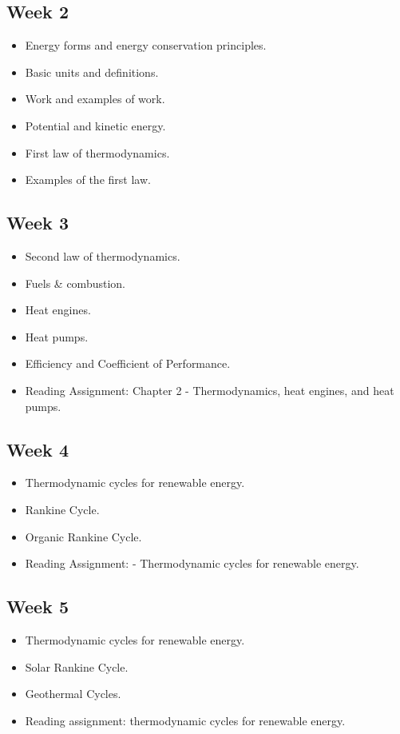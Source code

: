 \documentclass[11pt]{article}
\begin{document}
        \subsection*{Week 2}
	\begin{itemize}
\item Energy forms and energy conservation principles.
\item Basic units and definitions.
\item Work and examples of work.
\item Potential and kinetic energy.
\item First law of thermodynamics.
\item Examples of the first law.
        \end{itemize}
	\subsection*{Week 3}
	\begin{itemize}
	   \item Second law of thermodynamics.
	   \item Fuels \& combustion.
	   \item Heat engines.
            \item Heat pumps.
            \item Efficiency and Coefficient of Performance.
	    \item Reading Assignment: Chapter 2 - Thermodynamics, heat engines, and heat pumps.
	\end{itemize}
\subsection*{Week 4}
\begin{itemize}
	   \item Thermodynamic cycles for renewable energy.
	   \item Rankine Cycle.
	   \item Organic Rankine Cycle.
	    \item Reading Assignment:  - Thermodynamic cycles for renewable energy.
	\end{itemize}
\subsection*{Week 5}
	   \begin{itemize}
	   \item Thermodynamic cycles for renewable energy.
	   \item Solar Rankine Cycle.
	   \item Geothermal Cycles.
	    \item Reading assignment: thermodynamic cycles for renewable energy.
	\end{itemize}
 
\end{document}

